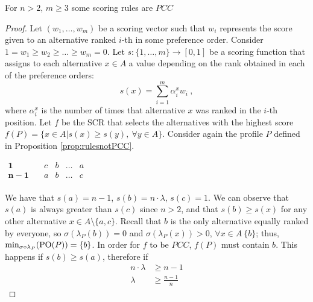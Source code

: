 \documentclass[version=3.21, pagesize, twoside=off, bibliography=totoc, DIV=calc, fontsize=12pt, a4paper]{scrartcl}
\begin{document}
\begin{proposition}
	\label{th:bound}
	For $n>2$, $m\geq3$ some scoring rules are  $PCC$ 
\end{proposition}
\begin{proof}
	Let $(w_1, \dots, w_m)$ be a scoring vector such that $w_i$ represents the score given to an alternative ranked $i$-th in some preference order. Consider $1 = w_1 \geq w_2 \geq \dots \geq w_{m} = 0$. Let $s:\{1,\dots,m\}\rightarrow [0,1]$ be a scoring function that assigns to each alternative $x \in A$ a value depending on the rank obtained in each of the preference orders: 
	\[ s(x) = \sum_{i=1}^{m} \alpha^{x}_i w_i \ ,\]
	where $\alpha^{x}_i$ is the number of times that alternative $x$ was ranked in the $i$-th position. Let $f$ be the SCR that selects the alternatives with the highest score $f(P)=\{x \in A | s(x)\geq s(y), \ \forall y \in A\}$.
	Consider again the profile $P$ defined in Proposition \ref{prop:rulesnotPCC}.
	\begin{center}
		$
		\begin{array}{ccccc}
		\mathbf{1} \quad &c&b&\dots &a\\
		\mathbf{n-1} \quad &a&b&\dots &c\\		
		\end{array}
		$
	\end{center}
	We have that $s(a)=n-1$, $s(b)=n\cdot \lambda$, $s(c)=1$. We can observe that $s(a)$ is always greater than $s(c)$ since $n>2$, and that $s(b)\geq s(x)$ for any other alternative $x\in A \setminus \{a,c\}$. Recall that $b$ is the only alternative equally ranked by everyone, so $\sigma(\lambda_P(b))=0$ and $\sigma(\lambda_P(x))>0$, $\forall x \in A \ \{b\}$; thus, $\mustar=\{b\}$. In order for $f$ to be $PCC$, $f(P)$ must contain $b$. This happens if $s(b)\geq s(a)$, therefore if 
	\begin{align}
	n\cdot\lambda &\geq n-1 \\
	\lambda &\geq \frac{n-1}{n} 
	\end{align}
\end{proof}
\end{document}
